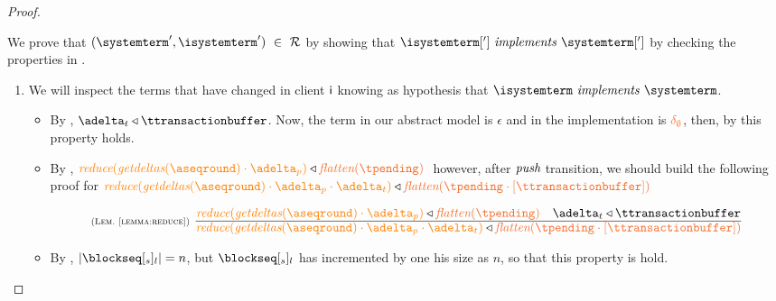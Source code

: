 \begin{proof}
\begin{itemize}
\begin{itemize}
				We  prove that $(\systemterm',\isystemterm') \ \in \ \mathcal{R}$ by showing that $\implements{\isystemterm[']}{\systemterm[']}$ 
				by checking the properties in .			
					\begin{enumerate}
						\item We will inspect the terms that have changed in client ${\sf i}$ knowing as hypothesis that $\implements{\isystemterm}{\systemterm}$.
						\begin{itemize}
							
							\item By , $\transactionbuffer \triangleleft{\ttransactionbuffer}$. Now, the term in our abstract model is $\epsilon$ and in the implementation is $\emptydelta$, then, by \triangemptydelta this property holds.
							
						\item By , $\ireduce{\igetdeltas{\pending}\cdot{\pushbuffer}}\triangleleft \flatten{\tpending} \ $ however, after $\textit{push}$ transition, we should build the following proof for 
						$\ireduce{\igetdeltas{\pending}\cdot{\pushbuffer}\cdot \transactionbuffer}\triangleleft \flatten{\tpending\cdot [\ttransactionbuffer]} \ $
						
					\[
						  \mathrulean{\lemref{lemma:reduce}}
						  {\ireduce{\igetdeltas{\pending}\cdot{\pushbuffer}} \triangleleft \flatten{\tpending}
								\quad
								\transactionbuffer \triangleleft \ttransactionbuffer}
  						{\ireduce{\igetdeltas{\pending}\cdot{\pushbuffer}\cdot \transactionbuffer}\triangleleft \flatten{\tpending\cdot [\ttransactionbuffer]}}  
					\]
					  \item By , $|\tsent_l| = n$, but $\tsent_l$ has incremented by one his size as $n$, so that this property is hold.
						\end{itemize}
						
						

					\end{enumerate}
					
	
	

\end{itemize}
\end{itemize}
\end{proof}
